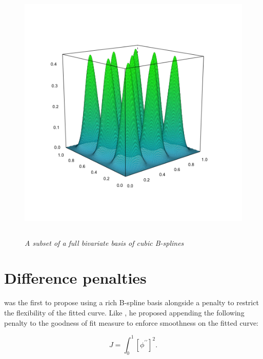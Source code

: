 \begin{figure}[H]
  \centering
  \graphicspath{{img/}}
  \includegraphics[width=5in,height=5in]{sparse_bicubic_basis.png}
  \caption{\textit{A subset of a full bivariate basis of cubic B-splines}}\label{fig:sparse_bicubic_BS_basis}
\end{figure}



\section{Difference penalties}

\cite{o1986statistical} was the first to propose using a rich B-spline basis alongside a penalty to restrict the flexibility of the fitted curve. Like \citet{wahba1990spline}, he proposed appending the following penalty to the goodness of fit measure to enforce smoothness on the fitted curve:

\begin{equation} \label{eq:second-derivative-penalty}
J = \int_0^1 \left[ \phi^{\prime \prime}\right]^2.
\end{equation}

